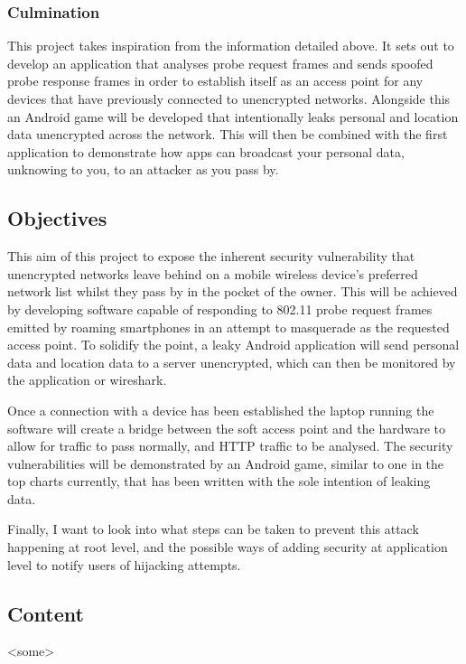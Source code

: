 \subsubsection{Culmination}

This project takes inspiration from the information detailed above. It sets out to develop an application that analyses probe request frames and sends spoofed probe response frames in order to establish itself as an access point for any devices that have previously connected to unencrypted networks. Alongside this an Android game will be developed that intentionally leaks personal and location data unencrypted across the network. This will then be combined with the first application to demonstrate how apps can broadcast your personal data, unknowing to you, to an attacker as you pass by.

\subsection{Objectives}
This aim of this project to expose the inherent security vulnerability that unencrypted networks leave behind on a mobile wireless device's preferred network list whilst they pass by in the pocket of the owner. This will be achieved by developing software capable of responding to 802.11 probe request frames emitted by roaming smartphones in an attempt to masquerade as the requested access point. To solidify the point, a leaky Android application will send personal data and location data to a server unencrypted, which can then be monitored by the application or wireshark.

Once a connection with a device has been established the laptop running the software will create a bridge between the soft access point and the hardware to allow for traffic to pass normally, and HTTP traffic to be analysed. The security vulnerabilities will be demonstrated by an Android game, similar to one in the top charts currently, that has been written with the sole intention of leaking data. 

Finally, I want to look into what steps can be taken to prevent this attack happening at root level, and the possible ways of adding security at application level to notify users of hijacking attempts.

\subsection{Content}
<some>
\clearpage